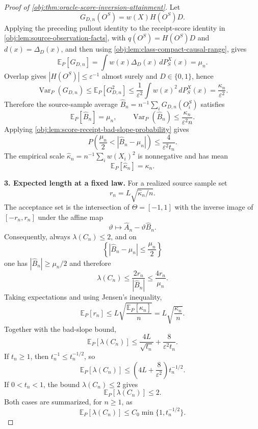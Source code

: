 \documentclass[11pt]{article}
\begin{document}
\begin{proof}[Proof of \cref{obj:thm:oracle-score-inversion-attainment}]
Let
\[
G_{D,n}(O^S)=w(X)H(O^S)D .
\]
Applying the preceding pullout identity to the receipt-score identity in \cref{obj:lem:source-observation-facts}, with \(q(O^S)=H(O^S)D\) and \(d(x)=\Delta_D(x)\), and then using \cref{obj:lem:class-compact-causal-range}, gives
\[
\mathbb E_P[G_{D,n}]
=
\int w(x)\Delta_D(x)\,dP_S^X(x)
=
\mu_n .
\]
Overlap gives \(|H(O^S)|\le\varepsilon^{-1}\) almost surely and \(D\in\{0,1\}\), hence
\[
\operatorname{Var}_P(G_{D,n})
\le
\mathbb E_P[G_{D,n}^2]
\le
\frac{1}{\varepsilon^2}
\int w(x)^2\,dP_S^X(x)
=
\frac{\kappa_n}{\varepsilon^2}.
\]
Therefore the source-sample average \(\widehat B_n=n^{-1}\sum_iG_{D,n}(O_i^S)\) satisfies
\[
\mathbb E_P[\widehat B_n]=\mu_n,
\qquad
\operatorname{Var}_P(\widehat B_n)\le\frac{\kappa_n}{\varepsilon^2 n}.
\]
Applying \cref{obj:lem:score-receipt-bad-slope-probability} gives
\[
P\!\left(\frac{\mu_n}{2}<|\widehat B_n-\mu_n|\right)
\le
\frac{4}{\varepsilon^2t_n}.
\]
The empirical scale \(\widehat\kappa_n=n^{-1}\sum_i w(X_i)^2\) is nonnegative and has mean
\[
\mathbb E_P[\widehat\kappa_n]=\kappa_n .
\] %

\textbf{3. Expected length at a fixed law.}
For a realized source sample set
\[
r_n=L\sqrt{\widehat\kappa_n/n}.
\]
The acceptance set is the intersection of \(\Theta=[-1,1]\) with the inverse image of \([-r_n,r_n]\) under the affine map
\[
\vartheta\mapsto \widehat A_n-\vartheta\widehat B_n .
\]
Consequently, always \(\lambda(C_n)\le2\), and on
\[
\left\{|\widehat B_n-\mu_n|\le\frac{\mu_n}{2}\right\}
\]
one has \(|\widehat B_n|\ge\mu_n/2\) and therefore
\[
\lambda(C_n)\le\frac{2r_n}{|\widehat B_n|}
\le\frac{4r_n}{\mu_n}.
\]
Taking expectations and using Jensen's inequality,
\[
\mathbb E_P[r_n]
\le
L\sqrt{\frac{\mathbb E_P[\widehat\kappa_n]}{n}}
=
L\sqrt{\frac{\kappa_n}{n}}.
\]
Together with the bad-slope bound,
\[
\mathbb E_P[\lambda(C_n)]
\le
\frac{4L}{\sqrt{t_n}}
+
\frac{8}{\varepsilon^2t_n}.
\]
If \(t_n\ge1\), then \(t_n^{-1}\le t_n^{-1/2}\), so
\[
\mathbb E_P[\lambda(C_n)]
\le
\left(4L+\frac8{\varepsilon^2}\right)t_n^{-1/2}.
\]
If \(0<t_n<1\), the bound \(\lambda(C_n)\le2\) gives
\[
\mathbb E_P[\lambda(C_n)]\le2.
\]
Both cases are summarized, for \(n\ge1\), as
\[
\mathbb E_P[\lambda(C_n)]
\le
C_0\min\{1,t_n^{-1/2}\}.
\] %


\end{proof}
\end{document}
